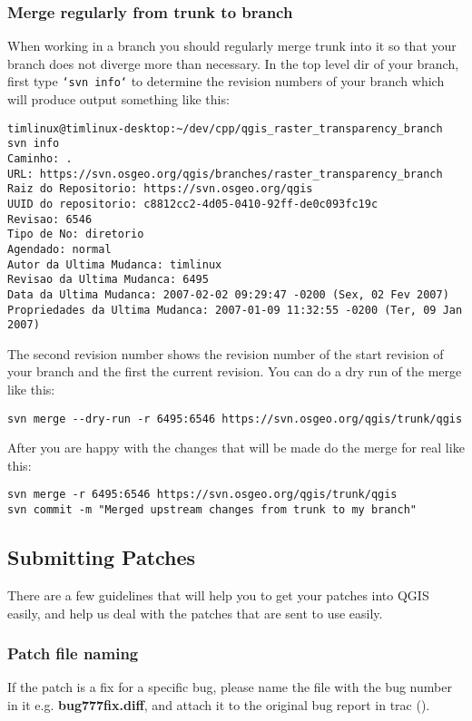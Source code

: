 \hypertarget{toc38}{}
\subsubsection{Merge regularly from trunk to branch}
When working in a branch you should regularly merge trunk into it so that your
branch does not diverge more than necessary. In the top level dir of your
branch, first type \texttt{`svn info`} to determine the revision numbers of your
branch which will produce output something like this:

\begin{verbatim}
timlinux@timlinux-desktop:~/dev/cpp/qgis_raster_transparency_branch svn info
Caminho: .
URL: https://svn.osgeo.org/qgis/branches/raster_transparency_branch
Raiz do Repositorio: https://svn.osgeo.org/qgis
UUID do repositorio: c8812cc2-4d05-0410-92ff-de0c093fc19c
Revisao: 6546
Tipo de No: diretorio
Agendado: normal
Autor da Ultima Mudanca: timlinux
Revisao da Ultima Mudanca: 6495
Data da Ultima Mudanca: 2007-02-02 09:29:47 -0200 (Sex, 02 Fev 2007)
Propriedades da Ultima Mudanca: 2007-01-09 11:32:55 -0200 (Ter, 09 Jan 2007)
\end{verbatim}

The second revision number shows the revision number of the start revision of
your branch and the first the current revision. You can do a dry run of the
merge like this:

\begin{verbatim}
svn merge --dry-run -r 6495:6546 https://svn.osgeo.org/qgis/trunk/qgis
\end{verbatim}

After you are happy with the changes that will be made do the merge for real
like this:

\begin{verbatim}
svn merge -r 6495:6546 https://svn.osgeo.org/qgis/trunk/qgis
svn commit -m "Merged upstream changes from trunk to my branch"
\end{verbatim}

\hypertarget{toc39}{}
\subsection{Submitting Patches}
There are a few guidelines that will help you to get your patches into QGIS
easily, and help us deal with the patches that are sent to use easily.

\hypertarget{toc40}{}
\subsubsection{Patch file naming}
If the patch is a fix for a specific bug, please name the file with the bug
number in it e.g.  \textbf{bug777fix.diff}, and attach it to the original bug report
in trac ().

